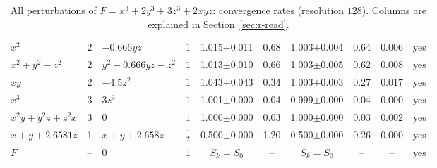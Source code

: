 \documentclass[12pt, a4paper]{article}
\theoremstyle{plain}
\theoremstyle{definition}
\theoremstyle{remark}
\theoremstyle{definition}
\begin{document}
\begin{table}[!h]
\begin{adjustbox}{max width=\textwidth}
\begin{tabular}{l c l c c c c c c c}
$x^2$ & 2 & $-0.666yz$ & $1$ & 1.015{\scriptsize$\pm$0.011} & 0.68 & 1.003{\scriptsize$\pm$0.004} & 0.64 & 0.006 & yes \\
$x^2+y^2-z^2$ & 2 & $y^2 - 0.666yz - z^2$ & $1$ & 1.013{\scriptsize$\pm$0.010} & 0.66 & 1.003{\scriptsize$\pm$0.005} & 0.62 & 0.008 & yes \\
$xy$ & 2 & $-4.5z^2$ & $1$ & 1.043{\scriptsize$\pm$0.043} & 0.34 & 1.003{\scriptsize$\pm$0.003} & 0.27 & 0.017 & yes \\
$x^3$ & 3 & $3z^3$ & $1$ & 1.001{\scriptsize$\pm$0.000} & 0.04 & 0.999{\scriptsize$\pm$0.000} & 0.04 & 0.000 & yes \\
$x^2y+y^2z+z^2x$ & 3 & $0$ & $1$ & 1.000{\scriptsize$\pm$0.000} & 0.03 & 1.000{\scriptsize$\pm$0.000} & 0.03 & 0.002 & yes \\
$x+y+2.6581z$ & 1 & $x + y + 2.658z$ & $\tfrac12$ & 0.500{\scriptsize$\pm$0.000} & 1.20 & 0.500{\scriptsize$\pm$0.000} & 0.26 & 0.000 & yes \\
$F$ & -- & $0$ & $1$ & $S_k=S_0$ & -- & $S_k=S_0$ & -- & -- & yes \\
\bottomrule
\end{tabular}
\end{adjustbox}
\caption[Rates for $x^3+2y^3+3z^3+2xyz$]{All perturbations of $F=x^3+2y^3+3z^3+2xyz$: convergence rates (resolution $128$). Columns are explained in Section~\ref{sec:r-read}.}
\label{tab:r-E6d-rates}
\end{table}
\end{document}
